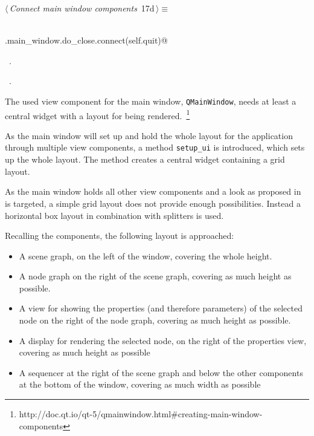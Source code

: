 \documentclass[
    a4paper,      %
    10pt,         %
    openright,    %
    notitlepage,  %
    parskip=half, %
]{scrreprt}       %
\theoremstyle{definition}                    %
\begin{document}
\begin{flushleft} \small
\begin{minipage}{\linewidth}\label{scrap10}\raggedright\small
{} $\langle\,${\itshape Connect main window components}\nobreak\ {\footnotesize {17d}}$\,\rangle\equiv$
\vspace{-1exm}
\begin{list}{}{} \item
\mbox{}\lstinline@@\\
\mbox{}\lstinline@self.main_window.do_close.connect(self.quit)@{\NWsep}
\end{list}
\vspace{-1.5ex}
\footnotesize
\begin{list}{}{\setlength{\itemsep}{-\parsep}\setlength{\itemindent}{-\leftmargin}}
\item \NWtxtMacroDefBy\ .
\item \NWtxtMacroRefIn\ .

\item{}
\end{list}
\end{minipage}\vspace{4ex}
\end{flushleft}
The used view component for the main window, \verb+QMainWindow+, needs at least
a central widget with a layout for being
rendered.~\footnote{http://doc.qt.io/qt-5/qmainwindow.html\#creating-main-window-components}

As the main window will set up and hold the whole layout for the application
through multiple view components, a method \verb+setup_ui+ is introduced, which
sets up the whole layout. The method creates a central widget containing a grid
layout.

As the main window holds all other view components and a look as proposed
in~ is targeted, a simple grid layout does
not provide enough possibilities. Instead a horizontal box layout in combination
with splitters is used.

Recalling the components, the following layout is approached:

\begin{itemize}
\item{%
    A scene graph, on the left of the window, covering the whole height.}
\item{%
    A node graph on the right of the scene graph, covering as much height as
    possible.}
\item{%
    A view for showing the properties (and therefore parameters) of the selected
    node on the right of the node graph, covering as much height as possible.}
\item{%
    A display for rendering the selected node, on the right of the properties
    view, covering as much height as possible}
\item{%
    A sequencer at the right of the scene graph and below the other components
    at the bottom of the window, covering as much width as possible}
\end{itemize}
\end{document}
